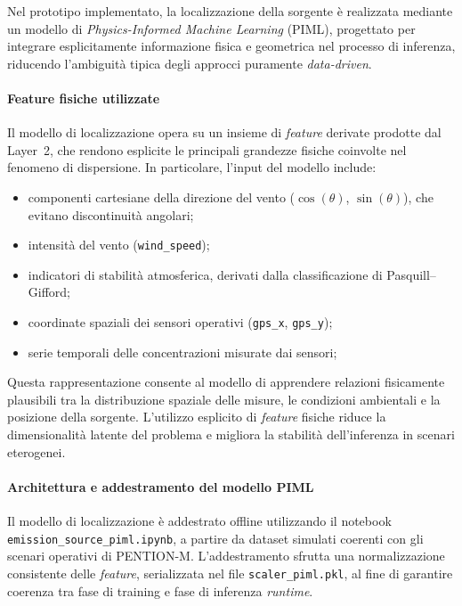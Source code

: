Nel prototipo implementato, la localizzazione della sorgente è realizzata mediante un modello di \emph{Physics-Informed Machine Learning} (PIML), progettato per integrare esplicitamente informazione fisica e geometrica nel processo di inferenza, riducendo l’ambiguità tipica degli approcci puramente \textit{data-driven}.

\paragraph{Feature fisiche utilizzate}

Il modello di localizzazione opera su un insieme di \textit{feature} derivate prodotte dal Layer~2, che rendono esplicite le principali grandezze fisiche coinvolte nel fenomeno di dispersione.
In particolare, l’input del modello include:

\begin{itemize}
	\item componenti cartesiane della direzione del vento ($\cos(\theta)$, $\sin(\theta)$), che evitano discontinuità angolari;
	\item intensità del vento (\texttt{wind\_speed});
	\item indicatori di stabilità atmosferica, derivati dalla classificazione di Pasquill--Gifford;
	\item coordinate spaziali dei sensori operativi (\texttt{gps\_x}, \texttt{gps\_y});
	\item serie temporali delle concentrazioni misurate dai sensori;
\end{itemize}

Questa rappresentazione consente al modello di apprendere relazioni fisicamente plausibili tra la distribuzione spaziale delle misure, le condizioni ambientali e la posizione della sorgente.
L’utilizzo esplicito di \textit{feature} fisiche riduce la dimensionalità latente del problema e migliora la stabilità dell’inferenza in scenari eterogenei.

\paragraph{Architettura e addestramento del modello PIML}

Il modello di localizzazione è addestrato offline utilizzando il notebook \texttt{emission\_source\_piml.ipynb}, a partire da dataset simulati coerenti con gli scenari operativi di \textsc{PENTION-M}.
L’addestramento sfrutta una normalizzazione consistente delle \textit{feature}, serializzata nel file \texttt{scaler\_piml.pkl}, al fine di garantire coerenza tra fase di training e fase di inferenza \textit{runtime}.

